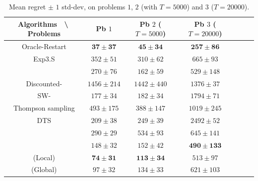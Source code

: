 \begin{table}[ht]
    \centering
    \begin{tabular}{c|cccccc}
    \textbf{Algorithms} $\;$ \textbackslash $\;$ \textbf{Problems} & Pb $1$ & Pb $2$ ($T=5000$) & Pb $3$ ($T=20000$) \\
        \hline
        Oracle-Restart \klUCB{} & $\mathbf{37 \pm 37}$ & $\mathbf{45 \pm 34}$ & $\mathbf{257 \pm 86}$ \\
        \hline
        Exp3.S & $352 \pm 51$ & $310 \pm 62$ & $665 \pm 93$ \\
        \hline
        \klUCB{} & $270 \pm 76$ & $162 \pm 59$ & $529 \pm 148$ \\
        Discounted-\klUCB{} & $1456 \pm 214$ & $1442 \pm 440$ & $1376 \pm 37$ \\
        SW-\klUCB{} & $177 \pm 34$ & $182 \pm 34$ & $1794 \pm 71$ \\
        \hline
        Thompson sampling & $493 \pm 175$ & $388 \pm 147$ & $1019 \pm 245$ \\
        DTS & $209 \pm 38$ & $249 \pm 39$ & $2492 \pm 52$ \\
        \hline
        \MklUCB{} & $290 \pm 29$ & $534 \pm 93$ & $645 \pm 141$ \\
        \CUSUMklUCB{} & $148 \pm 32$ & $152 \pm 42$ & $\mathbf{490 \pm 133}$ \\
        \hline
        \GLRklUCB{}(Local) & $\mathbf{74 \pm 31}$ & $\mathbf{113 \pm 34}$ & $513 \pm 97$ \\
        \GLRklUCB{}(Global) & $97 \pm 32$ & $134 \pm 33$ & $621 \pm 103$
    \end{tabular}
    \caption{Mean regret $\pm$ $1$ std-dev, on problems $1$, $2$ (with $T=5000$) and $3$ ($T=20000$).}
    \label{table:6:totalResults1}
\end{table}

